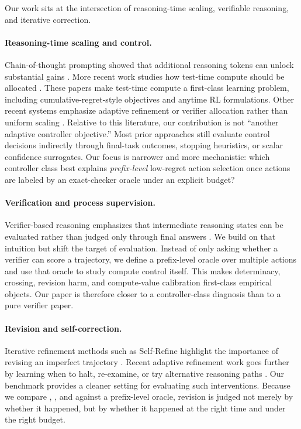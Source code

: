 Our work sits at the intersection of reasoning-time scaling, verifiable reasoning, and iterative correction.

\paragraph{Reasoning-time scaling and control.}
Chain-of-thought prompting showed that additional reasoning tokens can unlock substantial gains \citep{wei2022chain}.
More recent work studies how test-time compute should be allocated \citep{snell2024scaling,qu2025mrt,qi2025brpo}.
These papers make test-time compute a first-class learning problem, including cumulative-regret-style objectives and anytime RL formulations.
Other recent systems emphasize adaptive refinement or verifier allocation rather than uniform scaling \citep{lifshitz2025multiagent,jin2026corefine}.
Relative to this literature, our contribution is not ``another adaptive controller objective.''
Most prior approaches still evaluate control decisions indirectly through final-task outcomes, stopping heuristics, or scalar confidence surrogates.
Our focus is narrower and more mechanistic: which controller class best explains \emph{prefix-level} low-regret action selection once actions are labeled by an exact-checker oracle under an explicit budget?

\paragraph{Verification and process supervision.}
Verifier-based reasoning emphasizes that intermediate reasoning states can be evaluated rather than judged only through final answers \citep{cobbe2021training,lightman2023lets}.
We build on that intuition but shift the target of evaluation.
Instead of only asking whether a verifier can score a trajectory, we define a prefix-level oracle over multiple actions and use that oracle to study compute control itself.
This makes determinacy, crossing, revision harm, and compute-value calibration first-class empirical objects.
Our paper is therefore closer to a controller-class diagnosis than to a pure verifier paper.

\paragraph{Revision and self-correction.}
Iterative refinement methods such as Self-Refine highlight the importance of revising an imperfect trajectory \citep{madaan2023selfrefine}.
Recent adaptive refinement work goes further by learning when to halt, re-examine, or try alternative reasoning paths \citep{jin2026corefine}.
Our benchmark provides a cleaner setting for evaluating such interventions.
Because we compare \continue, \revise, and \abstain against a prefix-level oracle, revision is judged not merely by whether it happened, but by whether it happened at the right time and under the right budget.

